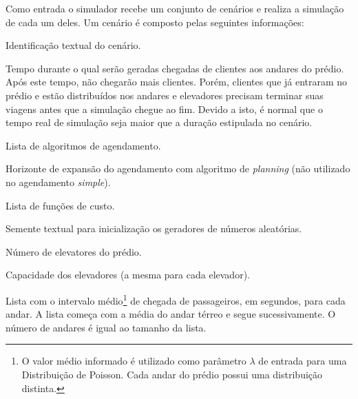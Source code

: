 Como entrada o simulador recebe um conjunto de cenários e realiza a simulação de
cada um deles. Um cenário é composto pelas seguintes informações:

\begin{description}[leftmargin=!,labelwidth=\widthof{\bfseries Função de Custo}]
  \item[Nome]

  Identificação textual do cenário.

  \item[Duração]

  Tempo durante o qual serão geradas chegadas de clientes aos andares do prédio.
  Após este tempo, não chegarão mais clientes. Porém, clientes que já entraram
  no prédio e estão distribuídos nos andares e elevadores precisam terminar suas
  viagens antes que a simulação chegue ao fim. Devido a isto, é normal que o
  tempo real de simulação seja maior que a duração estipulada no cenário.

  \item[Agendamento]

  Lista de algoritmos de agendamento.

  \item[Horizonte]

  Horizonte de expansão do agendamento com algoritmo de \textit{planning} (não utilizado no agendamento \textit{simple}).

  \item[Função de Custo]

  Lista de funções de custo.

  \item[Semente]

  Semente textual para inicialização os geradores de números aleatórias.

  \item[Elevadores]

  Número de elevatores do prédio.

  \item[Capacidade]

  Capacidade dos elevadores (a mesma para cada elevador).

  \item[Andares]

  Lista com o intervalo médio\footnote{O valor médio informado é utilizado como
  parâmetro $\lambda$ de entrada para uma Distribuição de Poisson. Cada andar do
  prédio possui uma distribuição distinta.} de chegada de passageiros, em
  segundos, para cada andar. A lista começa com a média do andar térreo e segue
  sucessivamente. O número de andares é igual ao tamanho da lista.

\end{description}

